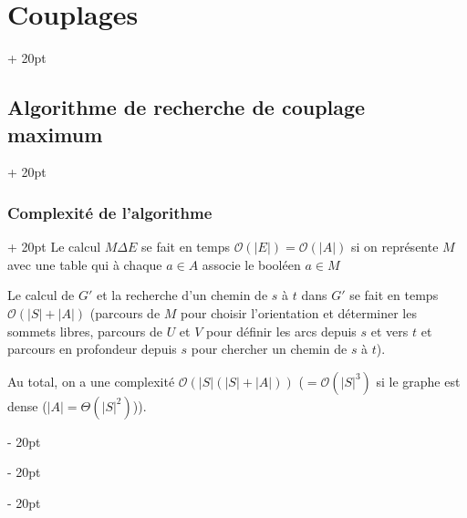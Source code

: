 \documentclass[a4paper, 12pt, twoside]{article}
\newcommand{\lr}[1]{\left( #1 \right)}
\newcommand{\abs}[1]{\left\lvert #1 \right\rvert}
\newcommand{\ind}[1][20pt]{\advance\leftskip + #1}
\newcommand{\deind}[1][20pt]{\advance\leftskip - #1}
\newenvironment{indt}[2][20pt]{#2 \par \ind[#1]}{\par \deind} %
\begin{document}
\begin{indt}{\section{Couplages}}
\begin{indt}{\subsection{Algorithme de recherche de couplage maximum}}
\begin{indt}{\subsubsection{Complexité de l'algorithme}}
                Le calcul $M \Delta E$ se fait en temps $\mathcal O(\abs E) = \mathcal O(\abs A)$ si on représente $M$ avec une table qui à chaque $a \in A$ associe le booléen $a \in M$

                Le calcul de $G'$ et la recherche d'un chemin de $s$ à $t$ dans $G'$ se fait en temps $\mathcal O(\abs S + \abs A)$ (parcours de $M$ pour choisir l'orientation et déterminer les sommets libres, parcours de $U$ et $V$ pour définir les arcs depuis $s$ et vers $t$ et parcours en profondeur depuis $s$ pour chercher un chemin de $s$ à $t$).

                Au total, on a une complexité $\mathcal O(\abs S (\abs S + \abs A))$ ($= \mathcal O\!\lr{\abs S ^3}$ si le graphe est dense ($\abs A = \Theta\!\lr{\abs S ^2}$)).
            \end{indt}
        \end{indt}
    \end{indt}
    
    
    
\end{document}
